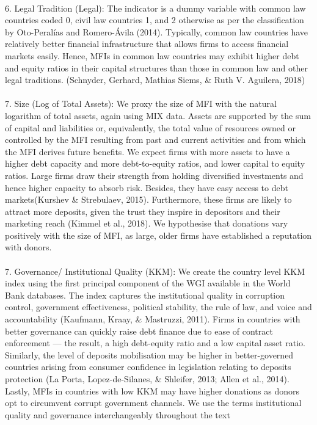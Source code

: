 \documentclass[a4paper,nobind]{templates/ociamthesis}
\begin{document}
\begin{longtabu}
\\
6. Legal Tradition (Legal): The indicator is a dummy variable with common law countries coded 0, civil law countries 1, and 2 otherwise as per the classification by Oto-Peralías and Romero-Ávila (2014). Typically, common law countries have relatively better financial infrastructure that allows firms to access financial markets easily. Hence, MFIs in common law countries may exhibit higher debt and equity ratios in their capital structures than those in common law and other legal traditions. (Schnyder, Gerhard, Mathias Siems, \& Ruth V. Aguilera, 2018)\\
\\
7. Size (Log of Total Assets): We proxy the size of MFI with the natural logarithm of total assets, again using MIX data. Assets are supported by the sum of capital and liabilities or, equivalently, the total value of resources owned or controlled by the MFI resulting from past and current activities and from which the MFI derives future benefits. We expect firms with more assets to have a higher debt capacity and more debt-to-equity ratios, and lower capital to equity ratios. Large firms draw their strength from holding diversified investments and hence higher capacity to absorb risk. Besides, they have easy access to debt markets(Kurshev \& Strebulaev, 2015). Furthermore, these firms are likely to attract more deposits, given the trust they inspire in depositors and their marketing reach (Kimmel et al., 2018). We hypothesise that donations vary positively with the size of MFI, as large, older firms have established a reputation with donors.\\
\addlinespace
\\
7. Governance/ Institutional Quality (KKM): We create the country level KKM index using the first principal component of the WGI available in the World Bank databases. The index captures the institutional quality in corruption control, government effectiveness, political stability, the rule of law, and voice and accountability (Kaufmann, Kraay, \& Mastruzzi, 2011). Firms in countries with better governance can quickly raise debt finance due to ease of contract enforcement — the result, a high debt-equity ratio and a low capital asset ratio. Similarly, the level of deposits mobilisation may be higher in better-governed countries arising from consumer confidence in legislation relating to deposits protection (La Porta, Lopez-de-Silanes, \& Shleifer, 2013; Allen et al., 2014). Lastly, MFIs in countries with low KKM may have higher donations as donors opt to circumvent corrupt government channels. We use the terms institutional quality and governance interchangeably throughout the text\\

\end{longtabu}
\end{document}
